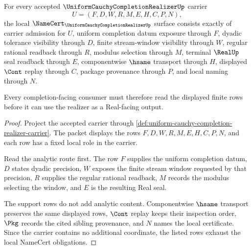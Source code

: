 \begin{theorem}
\label{thm:uniform-cauchy-completion-realizer-namecert-obligations}
For every accepted $\UniformCauchyCompletionRealizerUp$ carrier
$$
U=(F,D,W,R,M,E,H,C,P,N),
$$
the local $\NameCert_{\UniformCauchyCompletionRealizerUp}$ surface consists exactly of carrier admission for $U$, uniform completion datum exposure through $F$, dyadic tolerance visibility through $D$, finite stream-window visibility through $W$, regular rational readback through $R$, modulus selection through $M$, terminal $\RealUp$ seal readback through $E$, componentwise $\hsame$ transport through $H$, displayed $\Cont$ replay through $C$, package provenance through $P$, and local naming through $N$.

Every completion-facing consumer must therefore read the displayed finite rows before it can use the realizer as a Real-facing output.
\end{theorem}
\begin{proof}
Project the accepted carrier through \autoref{def:uniform-cauchy-completion-realizer-carrier}. The packet displays the rows $F,D,W,R,M,E,H,C,P,N$, and each row has a fixed local role in the carrier.

Read the analytic route first. The row $F$ supplies the uniform completion datum, $D$ states dyadic precision, $W$ exposes the finite stream window requested by that precision, $R$ supplies the regular rational readback, $M$ records the modulus selecting the window, and $E$ is the resulting Real seal.

The support rows do not add analytic content. Componentwise $\hsame$ transport preserves the same displayed rows, $\Cont$ replay keeps their inspection order, $\Pkg$ records the cited sibling provenance, and $N$ names the local certificate. Since the carrier contains no additional coordinate, the listed rows exhaust the local NameCert obligations.
\end{proof}

